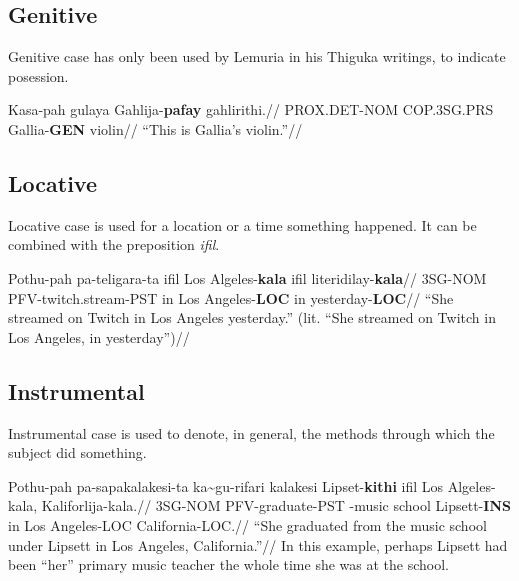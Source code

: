 \subsection{Genitive}
Genitive case has only been used by Lemuria in his Thiguka writings, to indicate posession.

\ex
\begingl
\gla  Kasa-pah     gulaya     Gahlija-\textbf{pafay} gahlirithi.//
\glb  PROX.DET-NOM COP.3SG.PRS Gallia-\textbf{GEN}   violin//
\glft ``This is Gallia's violin.''//
\endgl
\xe



\subsection{Locative}
Locative case is used for a location or a time something happened.
It can be combined with the preposition \textit{ifil}.

\ex
\begingl
\gla  Pothu-pah pa-teligara-ta        ifil Los Algeles-\textbf{kala} ifil literidilay-\textbf{kala}//
\glb  3SG-NOM   PFV-twitch.stream-PST in   Los Angeles-\textbf{LOC}  in   yesterday-\textbf{LOC}//
\glft ``She streamed on Twitch in Los Angeles yesterday.'' (lit. ``She streamed on Twitch in Los Angeles, in yesterday'')//
\endgl
\xe

\subsection{Instrumental}
Instrumental case is used to denote, in general, the methods through which the subject did something.

\ex
\begingl
\gla  Pothu-pah pa-sapakalakesi-ta ka\~{}gu-rifari  kalakesi Lipset-\textbf{kithi} ifil Los Algeles-kala, Kaliforlija-kala.//
\glb  3SG-NOM   PFV-graduate-PST   \agradj{}-music  school   Lipsett-\textbf{INS}  in   Los Angeles-LOC   California-LOC.//
\glft ``She graduated from the music school under Lipsett in Los Angeles, California.''//
\endgl
\xe
In this example, perhaps Lipsett had been ``her'' primary music teacher the whole time she was at the school.



